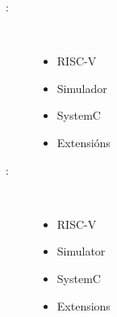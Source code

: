 \begin{multicols}{2}
\begin{description}
\item [\palabraschaveprincipal:] \mbox{}  \\[-20pt]
  \begin{itemize}
      \item RISC-V
      \item Simulador
      \item SystemC
      \item Extensións
  \end{itemize}
\end{description}
\begin{description}
\item [\palabraschavesecundaria:] \mbox{} \\[-20pt]
 \begin{itemize}
     \item RISC-V
     \item Simulator
     \item SystemC
     \item Extensions
 \end{itemize}
\end{description}
\end{multicols}
